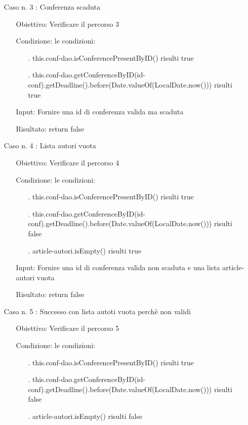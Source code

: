 \begin{itemize}
\item[Caso n. 3 :] Conferenza scaduta
\begin{itemize}
\item[Obiettivo:] Verificare il percorso 3
\item[Condizione:] le condizioni:
\begin{itemize}
\item[.]  this.conf-dao.isConferencePresentByID() risulti true
\item[.]  this.conf-dao.getConferenceByID(id-conf).getDeadline().before(Date.valueOf(LocalDate.now())) risulti true 
\end{itemize}
\item[Input:] Fornire una id di conferenza valida ma scaduta
\item[Risultato:] return false
\end{itemize}
\item[Caso n. 4 :] Lista autori vuota
\begin{itemize}
\item[Obiettivo:] Verificare il percorso  4
\item[Condizione:] le condizioni:
\begin{itemize}
\item[.]  this.conf-dao.isConferencePresentByID() risulti true
\item[.]  this.conf-dao.getConferenceByID(id-conf).getDeadline().before(Date.valueOf(LocalDate.now())) risulti false
\item[.] article-autori.isEmpty() risulti true
\end{itemize}
\item[Input:] Fornire una id di conferenza valida non scaduta e una lista article-autori vuota 
\item[Risultato:] return false
\end{itemize}
\item[Caso n. 5 :] Successo con lista autoti vuota perchè non validi
\begin{itemize}
\item[Obiettivo:] Verificare il percorso 5
\item[Condizione:] le condizioni: 
\begin{itemize}
\item[.]  this.conf-dao.isConferencePresentByID() risulti true
\item[.]  this.conf-dao.getConferenceByID(id-conf).getDeadline().before(Date.valueOf(LocalDate.now())) risulti false
\item[.] article-autori.isEmpty() risulti false

\end{itemize}
\end{itemize}
\end{itemize}
